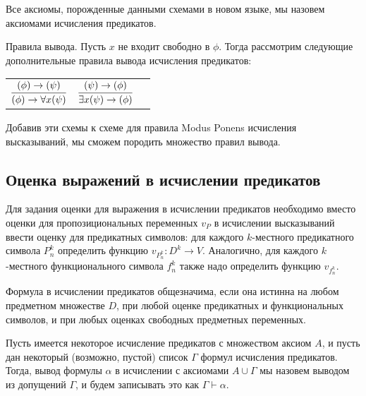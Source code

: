 Все аксиомы, порожденные данными схемами в новом языке, мы назовем аксиомами исчисления
предикатов.

Правила вывода.
Пусть $x$ не входит свободно в $\phi$. Тогда рассмотрим следующие дополнительные
правила вывода исчисления предикатов:

\begin{tabular}{lll}
$\infer{(\phi) \rightarrow \forall{x}(\psi)}{(\phi) \rightarrow (\psi)}$ &
$\infer{\exists{x}(\psi) \rightarrow (\phi)}{(\psi) \rightarrow (\phi)}$
\end{tabular}

Добавив эти схемы к схеме для правила Modus Ponens исчисления высказываний,
мы сможем породить множество правил вывода.


\subsection{Оценка выражений в исчислении предикатов}

Для задания оценки для выражения в исчислении предикатов необходимо
вместо оценки для пропозициональных переменных $v_P$ в исчислении 
высказываний ввести оценку для предикатных символов: для каждого 
$k$-местного предикатного символа $P^k_n$ определить функцию 
$v_{P^k_n}: D^k \rightarrow V$. Аналогично, для каждого $k$-местного 
функционального символа $f^k_n$ также надо определить функцию 
$v_{f^k_n}$.

\begin{definition}Формула в исчислении предикатов общезначима, если она 
истинна на любом предметном множестве $D$, при любой оценке предикатных
и функциональных символов, и при любых оценках свободных предметных
переменных.
\end{definition}

\begin{definition}Пусть имеется некоторое исчисление предикатов с множеством
аксиом $A$, и пусть дан некоторый (возможно, пустой) список $\Gamma$ 
формул исчисления предикатов. Тогда, вывод формулы $\alpha$
в исчислении с аксиомами $A \cup \Gamma$ мы назовем выводом из 
допущений $\Gamma$, и будем записывать это как $\Gamma \vdash \alpha$.
\end{definition}

